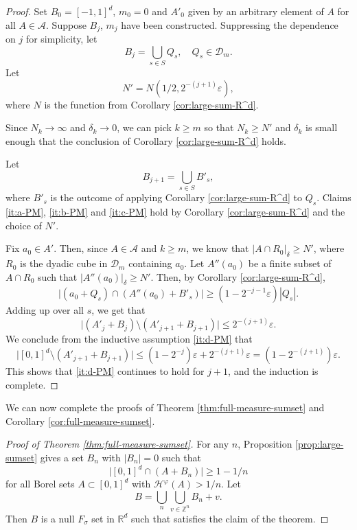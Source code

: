 \documentclass[12pt]{amsart}
\newcommand{\e}{\varepsilon}
\renewcommand{\phi}{\varphi}
\def\R{{\mathbb{R}}}
\def\Z{{\mathbb{Z}}}
\newcommand{\cD}{\mathcal{D}}
\numberwithin{theorem}{section}
\numberwithin{equation}{section}
\begin{document}
\begin{proof}
    Set $B_0=[-1,1]^d$, $m_0=0$ and $A'_0$ given by an arbitrary element of $A$ for all $A\in\mathcal{A}$. Suppose $B_j$, $m_j$ have been constructed. Suppressing the dependence on $j$ for simplicity, let
    \[
      B_j = \bigcup_{s\in S} Q_s, \quad Q_s\in\mathcal{D}_{m}.
    \]
    Let
    \[
        N' = N(1/2,2^{-(j+1)}\e),
    \]
    where $N$ is the function from Corollary \ref{cor:large-sum-R^d}.

    Since $N_k\to\infty$ and $\delta_k\to 0$, we can pick $k\ge m$ so that $N_k\ge N'$ and $\delta_k$ is small enough that the conclusion of Corollary \ref{cor:large-sum-R^d} holds.

    Let
    \[
        B_{j+1} = \bigcup_{s\in S} B'_s,
    \]
    where $B'_s$ is the outcome of applying Corollary \ref{cor:large-sum-R^d} to $Q_s$.  Claims \ref{it:a-PM}, \ref{it:b-PM} and \ref{it:c-PM} hold by Corollary \ref{cor:large-sum-R^d} and the choice of $N'$.

    Fix $a_0\in A'$. Then, since $A\in\mathcal{A}$ and $k\ge m$, we know that $|A\cap R_0|_{\delta}\ge N'$, where $R_0$ is the dyadic cube in $\cD_{m}$ containing $a_0$. Let $A''(a_0)$ be a finite subset of $A\cap R_0$ such that $|A''(a_0)|_{\delta}\ge N'$. Then, by Corollary \ref{cor:large-sum-R^d},
    \[
        \bigl| (a_0+Q_s)\cap (A''(a_0) + B'_s) \bigr| \ge \left(1-2^{-j-1}\e\right)|Q_s|.
    \]
    Adding up over all $s$, we get that
    \[
        \bigl| (A'_j  + B_j) \setminus (A'_{j+1} + B_{j+1})\bigr| \le 2^{-(j+1)}\e.
    \]
    We conclude from the inductive assumption \ref{it:d-PM} that
    \[
        \bigl| [0,1]^d\setminus (A'_{j+1}+B_{j+1})\bigr| \le (1-2^{-j})\e + 2^{-(j+1)}\e = (1-2^{-(j+1)})\e.
    \]
    This shows that \ref{it:d-PM} continues to hold for $j+1$, and the induction is complete.
\end{proof}

We can now complete the proofs of Theorem \ref{thm:full-measure-sumset} and Corollary \ref{cor:full-measure-sumset}.

\begin{proof}[Proof of Theorem \ref{thm:full-measure-sumset}]
    For any $n$, Proposition \ref{prop:large-sumset} gives a set $B_n$ with $|B_n|=0$ such that
    \[
        \bigl|[0,1]^d\cap (A+B_n)\bigr| \ge 1-1/n
    \]
    for all Borel sets $A\subset [0,1]^d$ with $\mathcal{H}^{\phi}(A)>1/n$. Let
    \[
    B=\bigcup_n \bigcup_{v\in\Z^n} B_n+v.
    \]
    Then $B$ is a null $F_\sigma$ set in $\R^d$ such that satisfies the claim of the theorem.
\end{proof}
\end{document}
